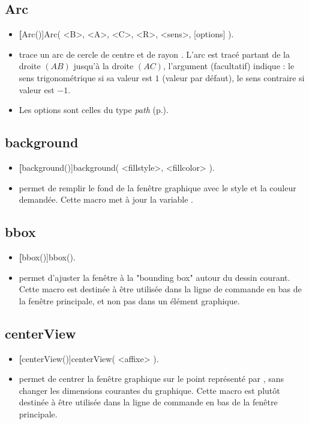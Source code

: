 \subsection{Arc}\label{macArc}
\begin{itemize}
 \item \util \textbf[Arc()]{Arc( <B>, <A>, <C>, <R>, <sens>, [options] )}.
 \item \desc trace un arc de cercle de centre  et de rayon . L'arc est tracé partant de la droite $(AB)$ jusqu'à la droite $(AC)$, l'argument (facultatif)  indique : le sens trigonométrique si sa valeur est $1$ (valeur par défaut), le sens contraire si valeur est $-1$. 
 \item Les options sont celles du type \emph{path} (p.\pageref{typepath}).
\end{itemize}

\subsection{background}\label{macbackground}

\begin{itemize}
 \item \util \textbf[background()]{background( <fillstyle>, <fillcolor> )}.
 \item \desc permet de remplir le fond de la fenêtre graphique avec le style et la couleur demandée. Cette macro met à jour la variable .
\end{itemize}

\subsection{bbox}

\begin{itemize}
 \item \util \textbf[bbox()]{bbox()}.
 \item \desc permet d'ajuster la fenêtre à la "bounding box" autour du dessin courant. Cette macro est destinée à être utilisée dans la ligne de commande en bas de la fenêtre principale, et non pas dans un élément graphique.
\end{itemize}


\subsection{centerView}

\begin{itemize}
 \item \util \textbf[centerView()]{centerView( <affixe> )}.
 \item \desc permet de centrer la fenêtre graphique sur le point représenté par , sans changer les dimensions courantes du graphique. Cette macro est plutôt destinée à être utilisée dans la ligne de commande en bas de la fenêtre principale.
\end{itemize}


